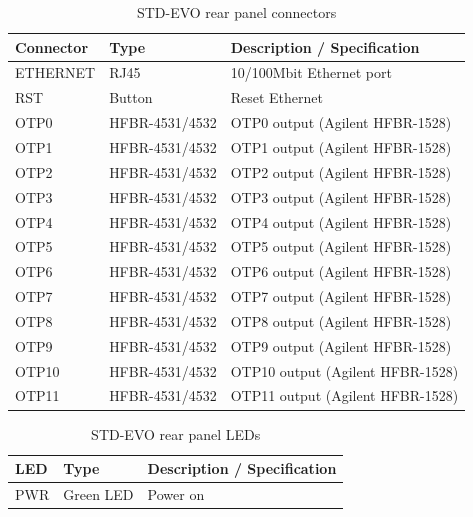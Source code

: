 \documentclass[openany]{article}
\begin{document}
	\begin{table}[!h]
	  \centering
	  \caption{STD-EVO rear panel connectors}
	  \label{tab:rear-panel-connectors}
	  \begin{tabular}{| m{3.5cm} m{4.0cm} m{7.0cm} |}
	    \hline
	    \bfseries Connector & \bfseries Type & \bfseries Description / Specification \\ \hline
	    ETHERNET & RJ45 & 10/100Mbit Ethernet port \\ \hline
	    RST & Button & Reset Ethernet \\ \hline
	    OTP0 & HFBR-4531/4532 & OTP0 output (Agilent HFBR-1528) \\ \hline
	    OTP1 & HFBR-4531/4532 & OTP1 output (Agilent HFBR-1528) \\ \hline
	    OTP2 & HFBR-4531/4532 & OTP2 output (Agilent HFBR-1528) \\ \hline
	    OTP3 & HFBR-4531/4532 & OTP3 output (Agilent HFBR-1528) \\ \hline
	    OTP4 & HFBR-4531/4532 & OTP4 output (Agilent HFBR-1528) \\ \hline
	    OTP5 & HFBR-4531/4532 & OTP5 output (Agilent HFBR-1528) \\ \hline
	    OTP6 & HFBR-4531/4532 & OTP6 output (Agilent HFBR-1528) \\ \hline
	    OTP7 & HFBR-4531/4532 & OTP7 output (Agilent HFBR-1528) \\ \hline
	    OTP8 & HFBR-4531/4532 & OTP8 output (Agilent HFBR-1528) \\ \hline
	    OTP9 & HFBR-4531/4532 & OTP9 output (Agilent HFBR-1528) \\ \hline
	    OTP10 & HFBR-4531/4532 & OTP10 output (Agilent HFBR-1528) \\ \hline
	    OTP11 & HFBR-4531/4532 & OTP11 output (Agilent HFBR-1528) \\ \hline
	  \end{tabular}
	\end{table}

	\begin{table}[!h]
	  \centering
	  \caption{STD-EVO rear panel LEDs}
	  \label{tab:rear-panel-leds}
	  \begin{tabular}{| m{3.5cm} m{4.0cm} m{7.0cm} |}
	    \hline
	    \bfseries LED & \bfseries Type & \bfseries Description / Specification \\ \hline
	    PWR & Green LED & Power on \\ \hline
	  \end{tabular}
	\end{table}
\end{document}
